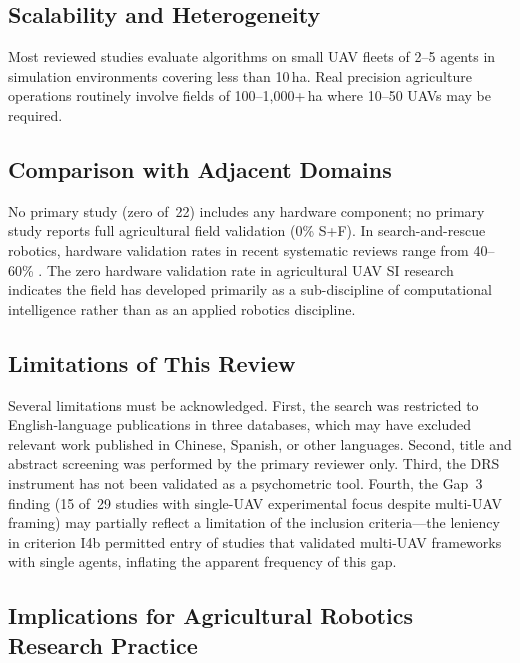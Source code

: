 \documentclass[review,3p]{elsarticle}
\begin{document}
\subsection{Scalability and Heterogeneity}

Most reviewed studies evaluate algorithms on small UAV fleets of 2--5 agents in
simulation environments covering less than 10\,ha. Real precision agriculture
operations routinely involve fields of 100--1,000+\,ha where 10--50 UAVs may be
required.

\subsection{Comparison with Adjacent Domains}
\label{sec:comparison}

No primary study (zero of~22) includes any hardware component; no primary study
reports full agricultural field validation (0\% S+F). In search-and-rescue
robotics, hardware validation rates in recent systematic reviews range from
40--60\% \cite{chung2018}. The zero hardware validation rate in agricultural
UAV SI research indicates the field has developed primarily as a sub-discipline
of computational intelligence rather than as an applied robotics discipline.

\subsection{Limitations of This Review}
\label{sec:limitations_discussion}

Several limitations must be acknowledged. First, the search was restricted to
English-language publications in three databases, which may have excluded
relevant work published in Chinese, Spanish, or other languages. Second,
title and abstract screening was performed by the primary reviewer only.
Third, the DRS instrument has not been validated as a psychometric tool.
Fourth, the Gap~3 finding (15 of~29 studies with single-UAV experimental
focus despite multi-UAV framing) may partially reflect a limitation of the
inclusion criteria---the leniency in criterion I4b permitted entry of studies
that validated multi-UAV frameworks with single agents, inflating the apparent
frequency of this gap.

\subsection{Implications for Agricultural Robotics Research Practice}
\label{sec:implications}
\end{document}
